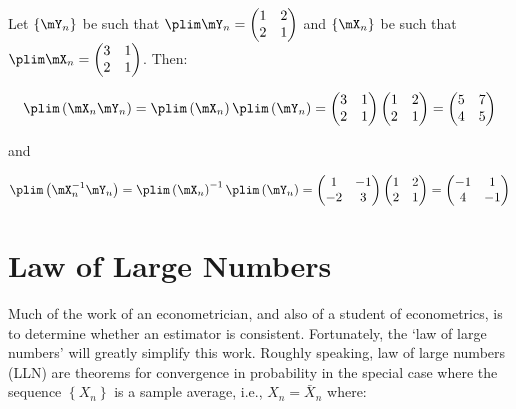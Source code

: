 \begin{example}
Let $\left\lbrace \mY_n \right\rbrace$ be such that $\plim \mY_n = \begin{pmatrix} 1 & 2 \\ 2 & 1 \end{pmatrix}$ and $\left\lbrace \mX_n \right\rbrace$ be such that $\plim \mX_n = \begin{pmatrix} 3 & 1 \\ 2 & 1 \end{pmatrix}$. Then:

\begin{equation*}
\plim \left(\mX_n\mY_n\right) = \plim\left(\mX_n\right)\plim \left(\mY_n\right) = \begin{pmatrix} 3 & 1 \\ 2 & 1 \end{pmatrix}\begin{pmatrix} 1 & 2 \\ 2 & 1 \end{pmatrix} =  \begin{pmatrix} 5 & 7 \\ 4 & 5 \end{pmatrix}
\end{equation*}

and

\begin{equation*}
\plim \left(\mX_n^{-1}\mY_n\right) = \plim\left(\mX_n\right)^{-1}\plim \left(\mY_n\right) = \begin{pmatrix} 1 & -1 \\ -2 & 3 \end{pmatrix}\begin{pmatrix} 1 & 2 \\ 2 & 1 \end{pmatrix} =  \begin{pmatrix} -1 & 1 \\ 4 & -1 \end{pmatrix}
\end{equation*}
\end{example}


\section{Law of Large Numbers}

Much of the work of an econometrician, and also of a student of econometrics, is to determine whether an estimator is consistent. Fortunately, the `law of large numbers' will greatly simplify this work. Roughly speaking, law of large numbers (LLN) are theorems for convergence in probability in the special case where the sequence $\left\lbrace X_n \right\rbrace$ is a sample average, i.e., $X_n = \bar{X}_n$ where:

